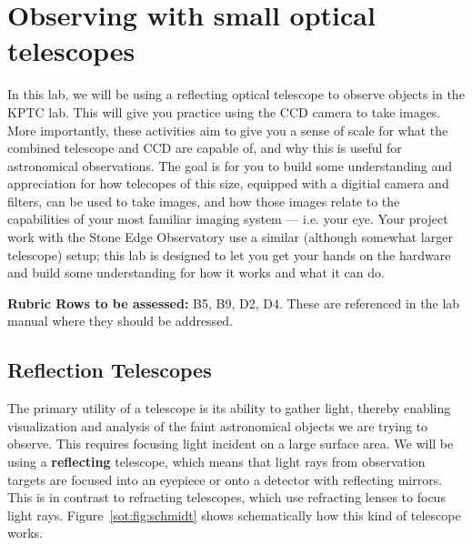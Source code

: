 \chapter{Observing with small optical telescopes}

In this lab, we will be using a reflecting optical telescope to observe objects in the KPTC
lab. This will give you practice using the CCD camera to take images. More importantly,
these activities aim to give you a sense of scale for what the combined telescope and CCD are
capable of, and why this is useful for astronomical observations. The goal is for you to build some
understanding and appreciation for how telecopes of this size, equipped with a digitial camera and
filters, can be used to take images, and how those images relate to the capabilities of your most
familiar imaging system --- i.e. your eye.
Your project work with the Stone Edge Observatory use a similar (although somewhat larger telescope) setup; this lab is designed to let you
get your hands on the hardware and build some understanding for how it works and what it can
do.

\textbf{Rubric Rows to be assessed:} B5, B9, D2, D4. These are referenced in the lab manual where they should be addressed.

\section{Reflection Telescopes}

The primary utility of a telescope is its ability to gather light, thereby enabling visualization and analysis of the faint astronomical objects we are trying to observe. This requires focusing light incident on a large surface area. We will be using a \textbf{reflecting} telescope, which means that light rays from observation targets are focused into an eyepiece or onto a detector with reflecting mirrors. This is in contrast to refracting telescopes, which use refracting lenses to focus light rays. Figure~\ref{sot:fig:schmidt} shows schematically how this kind of telescope works. 

